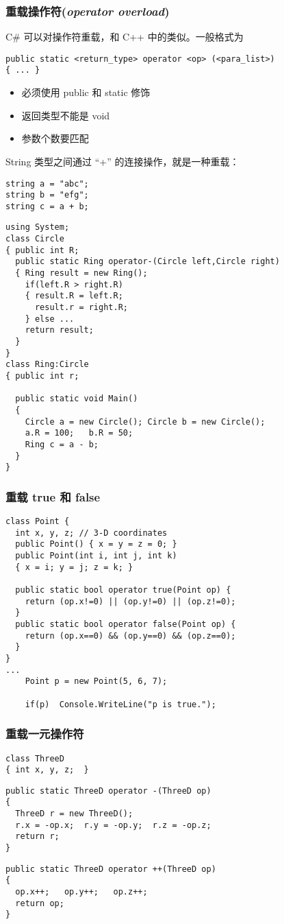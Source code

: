 \begin{frame}[fragile]
\frametitle{重载操作符(\textit{operator overload})}
C\# 可以对操作符重载，和 C++ 中的类似。一般格式为
\pause
\begin{lstlisting}
public static <return_type> operator <op> (<para_list>)
{ ... }
\end{lstlisting}
\pause
\begin{itemize}
\item 必须使用 public 和 static 修饰
\item 返回类型不能是 void
\item 参数个数要匹配
\end{itemize}
\pause
String 类型之间通过 ``+'' 的连接操作，就是一种重载：
\begin{lstlisting}
string a = "abc";
string b = "efg";
string c = a + b;
\end{lstlisting}
\end{frame}

\begin{frame}
\begin{lstlisting}
using System;
class Circle
{ public int R;
  public static Ring operator-(Circle left,Circle right)
  { Ring result = new Ring();
    if(left.R > right.R)
    { result.R = left.R;
      result.r = right.R;
    } else ...
    return result;
  }
}
class Ring:Circle
{ public int r;

  public static void Main()
  {
    Circle a = new Circle(); Circle b = new Circle();
    a.R = 100;   b.R = 50;
    Ring c = a - b;
  }
}
\end{lstlisting}
\end{frame}

\begin{frame}[fragile]
\frametitle{重载 true 和 false}
\begin{lstlisting}
class Point {
  int x, y, z; // 3-D coordinates
  public Point() { x = y = z = 0; }
  public Point(int i, int j, int k)
  { x = i; y = j; z = k; }

  public static bool operator true(Point op) {
    return (op.x!=0) || (op.y!=0) || (op.z!=0);
  }
  public static bool operator false(Point op) {
    return (op.x==0) && (op.y==0) && (op.z==0);
  }
}
...
    Point p = new Point(5, 6, 7);

    if(p)  Console.WriteLine("p is true.");
\end{lstlisting}
\end{frame}

\begin{frame}[fragile]
\frametitle{重载一元操作符}
\begin{lstlisting}
class ThreeD
{ int x, y, z;  }
\end{lstlisting}
\medskip
\begin{lstlisting}
public static ThreeD operator -(ThreeD op)
{
  ThreeD r = new ThreeD();
  r.x = -op.x;  r.y = -op.y;  r.z = -op.z;
  return r;
}
\end{lstlisting}
\medskip
\begin{lstlisting}
public static ThreeD operator ++(ThreeD op)
{
  op.x++;   op.y++;   op.z++;
  return op;
}
\end{lstlisting}
\end{frame}

